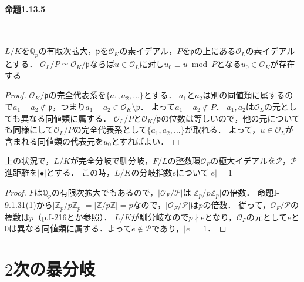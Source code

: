 \paragraph{命題1.13.5}~
\begin{screen}
  $L/K$を$\mathbb{Q}_p$の有限次拡大，$\mathfrak{p}$を$\mathcal{O}_K$の素イデアル，$P$を$\mathfrak{p}$の上にある$\mathcal{O}_L$の素イデアルとする．
  $\mathcal{O}_L/P\simeq\mathcal{O}_K/\mathfrak{p}$ならば$u\in\mathcal{O}_L$に対し$u_0\equiv u\bmod P$となる$u_0\in\mathcal{O}_K$が存在する
\end{screen}
\begin{proof}
  $\mathcal{O}_K/\mathfrak{p}$の完全代表系を$\{a_1,a_2,\ldots\}$とする．
  $a_1$と$a_2$は別の同値類に属するので$a_1-a_2\not\in\mathfrak{p}$，つまり$a_1-a_2\in\mathcal{O}_K\setminus\mathfrak{p}$．
  よって$a_1-a_2\not\in P$．
  $a_1, a_2$は$\mathcal{O}_L$の元としても異なる同値類に属する．
  $\mathcal{O}_L/P$と$\mathcal{O}_K/\mathfrak{p}$の位数は等しいので，他の元についても同様にして$\mathcal{O}_L/P$の完全代表系として$\{a_1,a_2,\ldots\}$が取れる．
  よって，$u\in\mathcal{O}_L$が含まれる同値類の代表元を$u_0$とすればよい．
\end{proof}

\begin{screen}
  上の状況で，$L/K$が完全分岐で馴分岐，$F/L$の整数環$\mathcal{O}_F$の極大イデアルを$\mathcal{P}$，$\mathcal{P}$進距離を$\lvert\bullet\rvert$とする．
  この時，$L/K$の分岐指数$e$について$\lvert e\rvert=1$
\end{screen}
\begin{proof}
  $F$は$\mathbb{Q}_p$の有限次拡大でもあるので，$\lvert\mathcal{O}_F/\mathcal{P}\rvert$は$\lvert\mathbb{Z}_p/p\mathbb{Z}_p\rvert$の倍数．
  命題I-9.1.31(1)から$\lvert\mathbb{Z}_p/p\mathbb{Z}_p\rvert=\lvert\mathbb{Z}/p\mathbb{Z}\rvert=p$なので，$\lvert\mathcal{O}_F/\mathcal{P}\rvert$は$p$の倍数．
  従って，$\mathcal{O}_F/\mathcal{P}$の標数は$p$（p.I-216とか参照）．
  $L/K$が馴分岐なので$p \nmid e$となり，$\mathcal{O}_F$の元として$e$と$0$は異なる同値類に属する．よって$e\not\in\mathcal{P}$であり，$\lvert e\rvert=1$．
\end{proof}

\section{$2$次の暴分岐}
